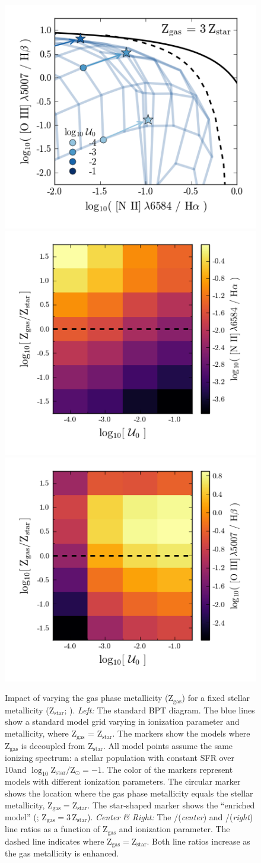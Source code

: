 \begin{figure}
  \begin{center}
    \includegraphics[width=0.283\linewidth]{figs/f27a.png}
    \includegraphics[width=0.283\linewidth]{figs/f27b.png}
    \includegraphics[width=0.283\linewidth]{figs/f27c.png}
    \caption{Impact of varying the gas phase metallicity (Z$_{\mathrm{gas}}$) for a fixed stellar metallicity (Z$_{\mathrm{star}}$; ). \emph{Left:} The standard BPT diagram. The blue lines show a standard model grid varying in ionization parameter and metallicity, where Z$_{\mathrm{gas}}$ = Z$_{\mathrm{star}}$. The markers show the models where Z$_{\mathrm{gas}}$ is decoupled from Z$_{\mathrm{star}}$.  All model points assume the same ionizing spectrum: a stellar population with constant SFR over 10\Myr and $\log_{10} \mathrm{Z}_{\mathrm{star}}/\mathrm{Z}_{\odot} = -1$. The color of the markers represent models with different ionization parameters. The circular marker shows the location where the gas phase metallicity equals the stellar metallicity, Z$_{\mathrm{gas}}=$Z$_{\mathrm{star}}$. The star-shaped marker shows the ``enriched model'' (; Z$_{\mathrm{gas}}=3\,$Z$_{\mathrm{star}}$). \emph{Center \& Right:} The \nii/\ha (\emph{center}) and \oiii/\hb (\emph{right}) line ratios as a function of Z$_{\mathrm{gas}}$ and ionization parameter. The dashed line indicates where $\mathrm{Z}_{\mathrm{gas}}=\mathrm{Z}_{\mathrm{star}}$. Both line ratios increase as the gas metallicity is enhanced.}
    \label{fig:diffZ}
  \end{center}
\end{figure}

